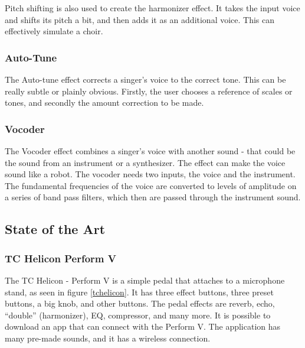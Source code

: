 Pitch shifting is also used to create the harmonizer effect. It takes the input voice and shifts its pitch a bit, and then adds it as an additional voice. This can effectively simulate a choir.

\subsubsection{Auto-Tune}

The Auto-tune effect corrects a singer's voice to the correct tone\citep{Hadhazy_2010}. This can be really subtle or plainly obvious. Firstly, the user chooses a reference of scales or tones, and secondly the amount correction to be made.

\subsubsection{Vocoder}

The Vocoder effect combines a singer's voice with another sound - that could be the sound from an instrument or a synthesizer\citep{Vocoder_00}. 
The effect can make the voice sound like a robot. The vocoder needs two inputs, the voice and the instrument. The fundamental frequencies of the voice are converted to levels of amplitude on a series of band pass filters, which then are passed through the instrument sound.


\subsection{State of the Art}


\subsubsection{TC Helicon Perform V}

The TC Helicon - Perform V is a simple pedal that attaches to a microphone stand, as seen in figure \ref{tchelicon}\citep{TC}. It has three effect buttons, three preset buttons, a big knob, and other buttons. The pedal effects are reverb, echo, “double” (harmonizer), EQ, compressor, and many more. It is possible to download an app that can connect with the Perform V. The application has many pre-made sounds, and it has a wireless connection. \\

\begin{minipage}{\linewidth}%
\label{tchelicon}
\end{minipage}\\

